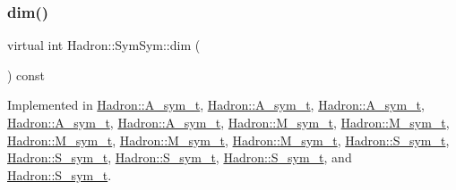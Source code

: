 \mbox{\label{structHadron_1_1SymSym_ae57780f41b9f6c03c6056eed3677bd48}} 
\subsubsection{\texorpdfstring{dim()}{dim()}\hspace{0.1cm}{\footnotesize\ttfamily [2/2]}}
{\footnotesize\ttfamily virtual int Hadron\+::\+Sym\+Sym\+::dim (\begin{DoxyParamCaption}{ }\end{DoxyParamCaption}) const\hspace{0.3cm}{\ttfamily [pure virtual]}}



Implemented in \mbox{\hyperlink{structHadron_1_1A__sym__t_a57e9460ee09050859f969d1f0cae0e92}{Hadron\+::\+A\+\_\+sym\+\_\+t}}, \mbox{\hyperlink{structHadron_1_1A__sym__t_a57e9460ee09050859f969d1f0cae0e92}{Hadron\+::\+A\+\_\+sym\+\_\+t}}, \mbox{\hyperlink{structHadron_1_1A__sym__t_a57e9460ee09050859f969d1f0cae0e92}{Hadron\+::\+A\+\_\+sym\+\_\+t}}, \mbox{\hyperlink{structHadron_1_1A__sym__t_a57e9460ee09050859f969d1f0cae0e92}{Hadron\+::\+A\+\_\+sym\+\_\+t}}, \mbox{\hyperlink{structHadron_1_1A__sym__t_a57e9460ee09050859f969d1f0cae0e92}{Hadron\+::\+A\+\_\+sym\+\_\+t}}, \mbox{\hyperlink{structHadron_1_1M__sym__t_a9ee8ba6fd6c2220231052690b2995ed5}{Hadron\+::\+M\+\_\+sym\+\_\+t}}, \mbox{\hyperlink{structHadron_1_1M__sym__t_a9ee8ba6fd6c2220231052690b2995ed5}{Hadron\+::\+M\+\_\+sym\+\_\+t}}, \mbox{\hyperlink{structHadron_1_1M__sym__t_a9ee8ba6fd6c2220231052690b2995ed5}{Hadron\+::\+M\+\_\+sym\+\_\+t}}, \mbox{\hyperlink{structHadron_1_1M__sym__t_a9ee8ba6fd6c2220231052690b2995ed5}{Hadron\+::\+M\+\_\+sym\+\_\+t}}, \mbox{\hyperlink{structHadron_1_1M__sym__t_a9ee8ba6fd6c2220231052690b2995ed5}{Hadron\+::\+M\+\_\+sym\+\_\+t}}, \mbox{\hyperlink{structHadron_1_1S__sym__t_ae8b1558dc91f46f5d78de03f1e587dc0}{Hadron\+::\+S\+\_\+sym\+\_\+t}}, \mbox{\hyperlink{structHadron_1_1S__sym__t_ae8b1558dc91f46f5d78de03f1e587dc0}{Hadron\+::\+S\+\_\+sym\+\_\+t}}, \mbox{\hyperlink{structHadron_1_1S__sym__t_ae8b1558dc91f46f5d78de03f1e587dc0}{Hadron\+::\+S\+\_\+sym\+\_\+t}}, \mbox{\hyperlink{structHadron_1_1S__sym__t_ae8b1558dc91f46f5d78de03f1e587dc0}{Hadron\+::\+S\+\_\+sym\+\_\+t}}, and \mbox{\hyperlink{structHadron_1_1S__sym__t_ae8b1558dc91f46f5d78de03f1e587dc0}{Hadron\+::\+S\+\_\+sym\+\_\+t}}.

